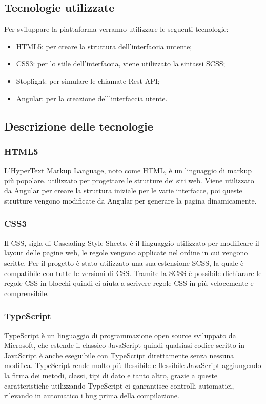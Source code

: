 \subsection{Tecnologie utilizzate}
Per sviluppare la piattaforma verranno utilizzare le seguenti tecnologie:
\begin{itemize}
    \item HTML5\gl{}: per creare la struttura dell'interfaccia untente;
    \item CSS3\gl{}: per lo stile dell'interfaccia, viene utilizzato la sintassi SCSS;
    \item Stoplight\gl{}: per simulare le chiamate Rest API;
    \item Angular\gl{}: per la creazione dell'interfaccia utente.
\end{itemize}
\subsection{Descrizione delle tecnologie}
\subsubsection{HTML5}
L'HyperText Markup Language, noto come HTML, è un linguaggio di markup più popolare, utilizzato per progettare le strutture dei siti web. Viene utilizzato da Angular per creare la struttura iniziale per le varie interfacce, poi queste strutture vengono modificate da Angular per generare la pagina dinamicamente. 
\subsubsection{CSS3}
Il CSS, sigla di Cascading Style Sheets, è il linguaggio utilizzato per modificare il layout delle pagine web, le regole vengono applicate nel ordine in cui vengono scritte. Per il progetto è stato utilizzato una sua estensione SCSS, la quale è compatibile con tutte le versioni di CSS. Tramite la SCSS è possibile dichiarare le regole CSS in blocchi quindi ci aiuta a scrivere regole CSS in più velocemente e comprensibile.
\subsubsection{TypeScript}
TypeScript è un linguaggio di programmazione open source sviluppato da Microsoft, che estende il classico JavaScript quindi qualsiasi codice scritto in JavaScript è anche eseguibile con TypeScript direttamente senza nessuna modifica. TypeScript rende molto più flessibile e flessibile JavaScript aggiungendo la firma dei metodi, classi, tipi di dato e tanto altro, grazie a queste caratteristiche utilizzando TypeScript ci ganrantisce controlli automatici, rilevando in automatico i bug prima della compilazione.
